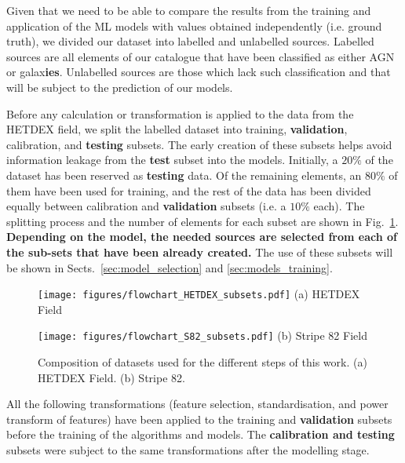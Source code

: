 \documentclass{aa}
\begin{document}
Given that we need to be able to compare the results from the training and application of the ML models with values obtained independently (i.e. ground truth), we divided our dataset into labelled and unlabelled sources. Labelled sources are all elements of our catalogue that have been classified as either AGN or galax\textbf{ies}. Unlabelled sources are those which lack such classification and that will be subject to the prediction of our models.  

Before any calculation or transformation is applied to the data from the HETDEX field, we split the labelled dataset into training, \textbf{validation}, calibration, and \textbf{testing} subsets. The early creation of these subsets helps avoid information leakage from the \textbf{test} subset into the models. Initially, a $20 \%$ of the dataset has been reserved as \textbf{testing} data. Of the remaining elements, an $80 \%$ of them have been used for training, and the rest of the data has been divided equally between calibration and \textbf{validation} subsets (i.e. a $10 \%$ each). The splitting process and the number of elements for each subset are shown in Fig.~\ref{fig:dataset_sizes}. \textbf{Depending on the model, the needed sources are selected from each of the sub-sets that have been already created.} The use of these subsets will be shown in Sects.~\ref{sec:model_selection} and \ref{sec:models_training}. 

\begin{figure}
  \centering
  \begin{minipage}{0.65\columnwidth}
    \centering
    \texttt{[image: figures/flowchart\_HETDEX\_subsets.pdf]}\hfill\break
    {(a) HETDEX Field}
  \end{minipage}
  \hfill
  \begin{minipage}{0.34\columnwidth}
    \centering
    \texttt{[image: figures/flowchart\_S82\_subsets.pdf]}
    \vspace{3.6cm}\hfill\break
    {(b) Stripe 82 Field}
  \end{minipage}
  \caption{Composition of datasets used for the different steps of this work. (a) HETDEX Field. (b) Stripe 82.}
  \label{fig:dataset_sizes}
\end{figure}

All the following transformations (feature selection, standardisation, and power transform of features) have been applied to the training and \textbf{validation} subsets before the training of the algorithms and models. 
The \textbf{calibration and testing} subsets were subject to the same transformations after the modelling stage.
\end{document}
